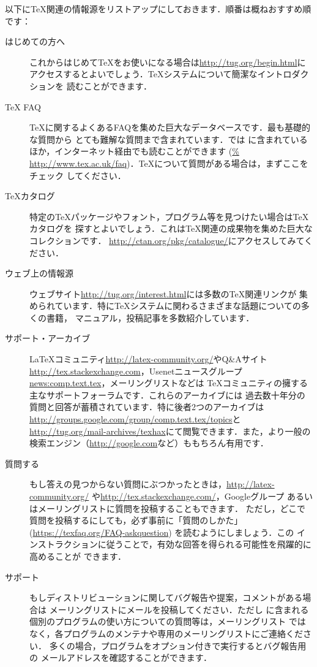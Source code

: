 \documentclass[uplatex,dvipdfmx]{jsarticle}
\begin{document}
以下に\TeX 関連の情報源をリストアップにしておきます．順番は概ねおすすめ順です：
%
\begin{description}
\item[はじめての方へ]
これからはじめて\TeX をお使いになる場合は\url{http://tug.org/begin.html}に
アクセスするとよいでしょう．\TeX システムについて簡潔なイントロダクションを
読むことができます．

\item[{\TeX} FAQ]
\TeX に関するよくあるFAQを集めた巨大なデータベースです．最も基礎的な質問から
とても難解な質問まで含まれています．\TL では
に含まれているほか，インターネット経由でも読むことができます (\url{%
http://www.tex.ac.uk/faq})．\TeX について質問がある場合は，まずここをチェック
してください．

\item[\TeX カタログ]
特定の\TeX パッケージやフォント，プログラム等を見つけたい場合は\TeX カタログを
探すとよいでしょう．これは\TeX 関連の成果物を集めた巨大なコレクションです．
\url{http://ctan.org/pkg/catalogue/}にアクセスしてみてください．

\item[ウェブ上の情報源]
ウェブサイト\url{http://tug.org/interest.html}には多数の\TeX 関連リンクが
集められています．特に\TeX システムに関わるさまざまな話題についての多くの書籍，
マニュアル，投稿記事を多数紹介しています．

\item[サポート・アーカイブ]
\LaTeX コミュニティ\url{http://latex-community.org/}やQ\&Aサイト
\url{http://tex.stackexchange.com}，Usenetニュースグループ
\url{news:comp.text.tex}，メーリングリストなどは
\TeX コミュニティの擁する主なサポートフォーラムです．これらのアーカイブには
過去数十年分の質問と回答が蓄積されています．特に後者2つのアーカイブは
\url{http://groups.google.com/group/comp.text.tex/topics}と
\url{http://tug.org/mail-archives/texhax}にて閲覧できます．また，より一般の
検索エンジン（\url{http://google.com}など）ももちろん有用です．

\item[質問する]
もし答えの見つからない質問にぶつかったときは，\url{http://latex-community.org/}%
や\url{http://tex.stackexchange.com/}，Googleグループ%
あるいはメーリングリストに質問を投稿することもできます．
ただし，どこで質問を投稿するにしても，必ず事前に「質問のしかた」
(\url{https://texfaq.org/FAQ-askquestion}) を読むようにしましょう．この
インストラクションに従うことで，有効な回答を得られる可能性を飛躍的に高めることが
できます．

\item[\TL サポート]
もし\TL ディストリビューションに関してバグ報告や提案，コメントがある場合は
\TL メーリングリストにメールを投稿してください．ただし
\TL に含まれる個別のプログラムの使い方についての質問等は，\TL メーリングリスト
ではなく，各プログラムのメンテナや専用のメーリングリストにご連絡ください．
多くの場合，プログラムをオプション付きで実行するとバグ報告用の
メールアドレスを確認することができます．
\end{description}
\end{document}
